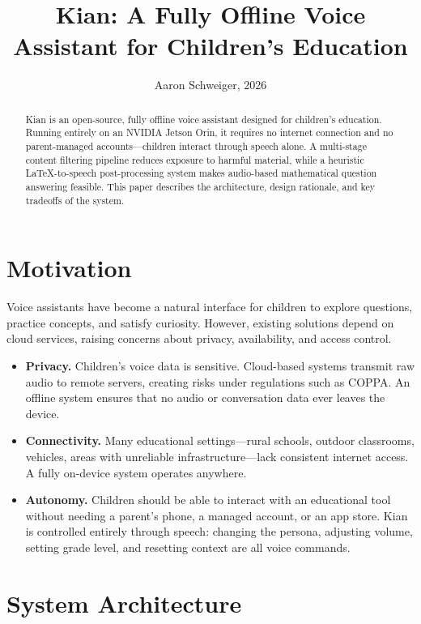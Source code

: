 \documentclass[11pt]{article}
\title{\textbf{Kian: A Fully Offline Voice Assistant for Children's Education}}
\author{Aaron Schweiger, 2026}
\date{\vspace{-2em}}
\begin{document}
\maketitle

\begin{abstract}
Kian is an open-source, fully offline voice assistant designed for children's education.
Running entirely on an NVIDIA Jetson Orin, it requires no internet connection and no parent-managed accounts---children interact through speech alone.
A multi-stage content filtering pipeline reduces exposure to harmful material, while a heuristic LaTeX-to-speech post-processing system makes audio-based mathematical question answering feasible.
This paper describes the architecture, design rationale, and key tradeoffs of the system.
\end{abstract}

\section{Motivation}

Voice assistants have become a natural interface for children to explore questions, practice concepts, and satisfy curiosity.
However, existing solutions depend on cloud services, raising concerns about privacy, availability, and access control.

\begin{itemize}[nosep]
  \item \textbf{Privacy.} Children's voice data is sensitive. Cloud-based systems transmit raw audio to remote servers, creating risks under regulations such as COPPA. An offline system ensures that no audio or conversation data ever leaves the device.
  \item \textbf{Connectivity.} Many educational settings---rural schools, outdoor classrooms, vehicles, areas with unreliable infrastructure---lack consistent internet access. A fully on-device system operates anywhere.
  \item \textbf{Autonomy.} Children should be able to interact with an educational tool without needing a parent's phone, a managed account, or an app store. Kian is controlled entirely through speech: changing the persona, adjusting volume, setting grade level, and resetting context are all voice commands.
\end{itemize}

\section{System Architecture}
\end{document}
